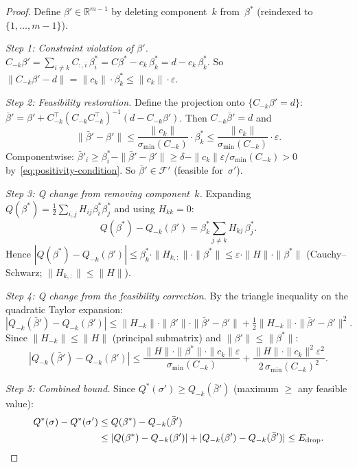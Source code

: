 \begin{proof}
Define $\beta' \in \mathbb{R}^{m-1}$ by deleting component~$k$
from~$\beta^*$ (reindexed to $\{1, \ldots, m-1\}$).

\emph{Step 1: Constraint violation of $\beta'$.}
$C_{-k}\beta' = \sum_{i \neq k} C_{:,i}\, \beta^*_i
= C\beta^* - c_k\, \beta^*_k = d - c_k\, \beta^*_k$.
So $\|C_{-k}\beta' - d\| = \|c_k\| \cdot \beta^*_k
\leq \|c_k\| \cdot \varepsilon$.

\emph{Step 2: Feasibility restoration.}
Define the projection onto $\{C_{-k}\beta' = d\}$:
$\bar\beta' = \beta' + C_{-k}^\top (C_{-k} C_{-k}^\top)^{-1}
  (d - C_{-k}\beta')$.
Then $C_{-k}\bar\beta' = d$ and
\[
  \|\bar\beta' - \beta'\|
  \leq \frac{\|c_k\|}{\sigma_{\min}(C_{-k})} \cdot \beta^*_k
  \leq \frac{\|c_k\|}{\sigma_{\min}(C_{-k})} \cdot \varepsilon.
\]
Componentwise: $\bar\beta'_i \geq \beta^*_i - \|\bar\beta' - \beta'\|
\geq \delta - \|c_k\| \varepsilon / \sigma_{\min}(C_{-k}) > 0$
by~\eqref{eq:positivity-condition}.
So $\bar\beta' \in \mathcal{F}'$ (feasible for~$\sigma'$).

\emph{Step 3: Q change from removing component~$k$.}
Expanding $Q(\beta^*) = \tfrac{1}{2}\sum_{i,j} H_{ij}\beta^*_i\beta^*_j$
and using $H_{kk} = 0$:
\begin{equation}\label{eq:q-removal}
  Q(\beta^*) - Q_{-k}(\beta')
  = \beta^*_k \sum_{j \neq k} H_{kj}\, \beta^*_j.
\end{equation}
Hence $|Q(\beta^*) - Q_{-k}(\beta')|
\leq \beta^*_k \cdot \|H_{k,:}\| \cdot \|\beta^*\|
\leq \varepsilon \cdot \|H\| \cdot \|\beta^*\|$
(Cauchy--Schwarz; $\|H_{k,:}\| \leq \|H\|$).

\emph{Step 4: Q change from the feasibility correction.}
By the triangle inequality on the quadratic Taylor expansion:
\[
  |Q_{-k}(\bar\beta') - Q_{-k}(\beta')|
  \leq \|H_{-k}\| \cdot \|\beta'\| \cdot \|\bar\beta' - \beta'\|
    + \tfrac{1}{2}\|H_{-k}\| \cdot \|\bar\beta' - \beta'\|^2.
\]
Since $\|H_{-k}\| \leq \|H\|$ (principal submatrix)
and $\|\beta'\| \leq \|\beta^*\|$:
\[
  |Q_{-k}(\bar\beta') - Q_{-k}(\beta')|
  \leq \frac{\|H\| \cdot \|\beta^*\| \cdot \|c_k\| \varepsilon}
            {\sigma_{\min}(C_{-k})}
    + \frac{\|H\| \cdot \|c_k\|^2 \varepsilon^2}
            {2\, \sigma_{\min}(C_{-k})^2}.
\]

\emph{Step 5: Combined bound.}
Since $Q^*(\sigma') \geq Q_{-k}(\bar\beta')$ (maximum $\geq$ any feasible value):
\begin{align*}
  Q^*(\sigma) - Q^*(\sigma')
  &\leq Q(\beta^*) - Q_{-k}(\bar\beta') \\
  &\leq |Q(\beta^*) - Q_{-k}(\beta')| + |Q_{-k}(\beta') - Q_{-k}(\bar\beta')|
  \leq E_{\mathrm{drop}}. \qedhere
\end{align*}
\end{proof}


